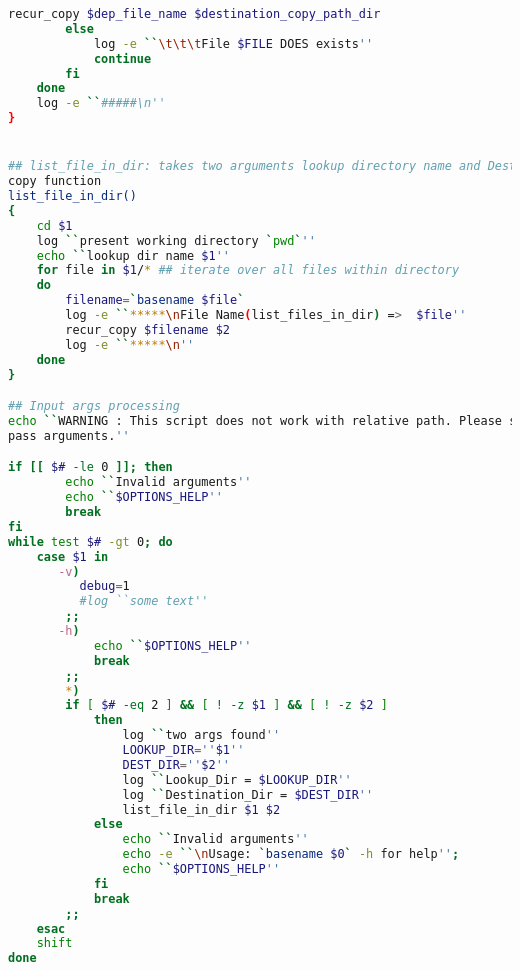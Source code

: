 \begin{lstlisting}[language=bash]
            recur_copy $dep_file_name $destination_copy_path_dir
        else
            log -e ``\t\t\tFile $FILE DOES exists''
            continue
        fi
    done    
    log -e ``#####\n'' 
}


## list_file_in_dir: takes two arguments lookup directory name and Destination path. Call recur_
copy function
list_file_in_dir()
{
    cd $1
    log ``present working directory `pwd`''
    echo ``lookup dir name $1''
    for file in $1/* ## iterate over all files within directory
    do
        filename=`basename $file`
        log -e ``*****\nFile Name(list_files_in_dir) =>  $file''
        recur_copy $filename $2
        log -e ``*****\n''
    done
}

## Input args processing
echo ``WARNING : This script does not work with relative path. Please specify full path when you 
pass arguments.''

if [[ $# -le 0 ]]; then
        echo ``Invalid arguments''
        echo ``$OPTIONS_HELP''
        break
fi
while test $# -gt 0; do
    case $1 in
       -v)
          debug=1
          #log ``some text''
        ;;
       -h)
            echo ``$OPTIONS_HELP''
            break
        ;;
        *)
        if [ $# -eq 2 ] && [ ! -z $1 ] && [ ! -z $2 ]
            then
                log ``two args found''
                LOOKUP_DIR=''$1''
                DEST_DIR=''$2''
                log ``Lookup_Dir = $LOOKUP_DIR''
                log ``Destination_Dir = $DEST_DIR''
                list_file_in_dir $1 $2
            else
                echo ``Invalid arguments''
                echo -e ``\nUsage: `basename $0` -h for help'';
                echo ``$OPTIONS_HELP''
            fi
            break
        ;;
    esac
    shift 
done



\end{lstlisting}

